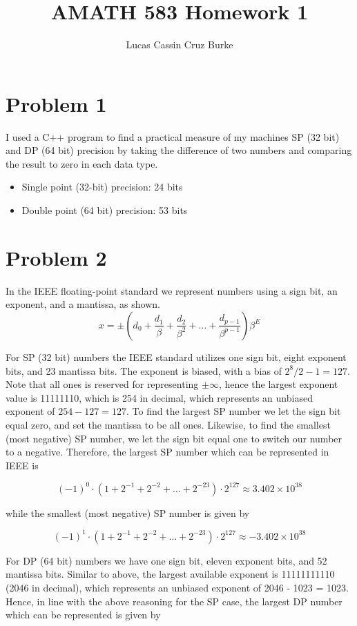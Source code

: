 \documentclass{article}
\title{AMATH 583 Homework 1}
\author{Lucas Cassin Cruz Burke}
\begin{document}
\maketitle

\section*{Problem 1}
I used a C++ program to find a practical measure of my machines SP (32 bit) and DP (64 bit) precision by taking the difference of two numbers and comparing the result to zero in each data type. 
\begin{itemize}
    \item Single point (32-bit) precision: 24 bits 
    \item Double point (64 bit) precision: 53 bits
\end{itemize}

\section*{Problem 2}

In the IEEE floating-point standard we represent numbers using a sign bit, an exponent, and a mantissa, as shown. $$x = \pm \left( d_0 + \frac{d_1}{\beta} + \frac{d_2}{\beta^2} + \dots + \frac{d_{p-1}}{\beta^{p-1}}\right)\beta^E$$

For SP (32 bit) numbers the IEEE standard utilizes one sign bit, eight exponent bits, and 23 mantissa bits. The exponent is biased, with a bias of $2^{8}/2-1=127$. Note that all ones is reserved for representing $\pm \infty$, hence the largest exponent value is 11111110, which is 254 in decimal, which represents an unbiased exponent of $254-127=127$. To find the largest SP number we let the sign bit equal zero, and set the mantissa to be all ones. Likewise, to find the smallest (most negative) SP number, we let the sign bit equal one to switch our number to a negative. Therefore, the largest SP number which can be represented in IEEE is 

$$(-1)^0 \cdot \left(1 + 2^{-1} + 2^{-2} + \dots + 2^{-23} \right)\cdot 2^{127} \approx 3.402 \times 10^{38}$$

while the smallest (most negative) SP number is given by 

$$(-1)^1 \cdot \left(1 + 2^{-1} + 2^{-2} + \dots + 2^{-23} \right)\cdot 2^{127} \approx -3.402 \times 10^{38}$$

For DP (64 bit) numbers we have one sign bit, eleven exponent bits, and 52 mantissa bits. Similar to above, the largest available exponent is 11111111110 (2046 in decimal), which represents an unbiased exponent of 2046 - 1023 = 1023. Hence, in line with the above reasoning for the SP case, the largest DP number which can be represented is given by 
\end{document}
